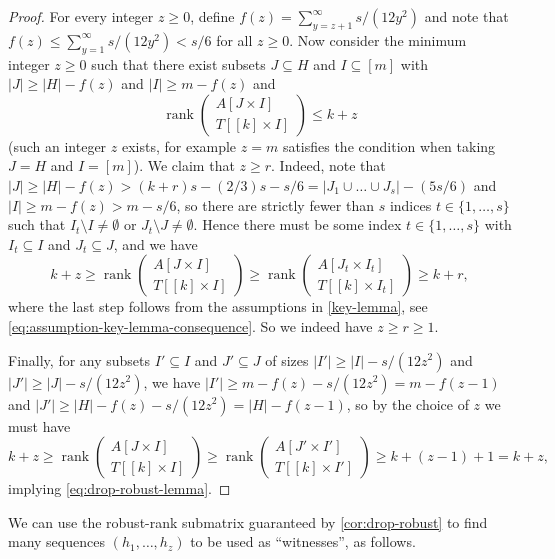 \documentclass[english]{article}
\theoremstyle{remark}
\numberwithin{equation}{section}
\numberwithin{figure}{section}
\newcommand{\su}{\subseteq}
\newcommand{\on}{\operatorname}
\begin{document}
\begin{proof}
For every integer $z\ge 0$, define $f(z)=\sum_{y=z+1}^{\infty} s/(12y^2)$ and note that $f(z)\le \sum_{y=1}^{\infty} s/(12y^2)< s/6$ for all $z\ge 0$. Now consider the minimum integer $z\ge 0$ such that there exist subsets $J\subseteq H$ and $I\subseteq[m]$ with $|J|\ge |H|-f(z)$ and $|I|\ge m-f(z)$ and
\[\on{rank}\begin{pmatrix}A[J\times I]\\ T[[k]\times I]\end{pmatrix}\le k+z\]
(such an integer $z$ exists, for example $z=m$ satisfies the condition when taking $J= H$ and $I=[m]$). We claim that $z\ge r$. Indeed, note that $|J|\ge |H|-f(z)> (k+r)s-(2/3)s-s/6=|J_1\cup\dots\cup J_s|-(5s/6)$ and $|I|\ge m-f(z)> m-s/6$, so there are strictly fewer than $s$ indices $t\in \{1,\dots,s\}$ such that $I_t\setminus I\ne \emptyset$ or $J_t\setminus J\ne \emptyset$. Hence there must be some index $t\in \{1,\dots,s\}$ with $I_t\su I$ and $J_t\su J$, and we have
\[k+z\ge \on{rank}\begin{pmatrix}A[J\times I]\\ T[[k]\times I]\end{pmatrix}\ge \on{rank}\begin{pmatrix}A[J_t\times I_t]\\ T[[k]\times I_t]\end{pmatrix}\ge k+r,\]
where the last step follows from the assumptions in \cref{key-lemma}, see \cref{eq:assumption-key-lemma-consequence}. So we indeed have $z\ge r\ge 1$.

Finally, for any subsets $I'\su I$ and $J'\su J$ of sizes $|I'|\ge |I|-s/(12z^2)$ and $|J'|\ge |J|-s/(12z^2)$, we have $|I'|\ge m-f(z)-s/(12z^2)=m-f(z-1)$ and $|J'|\ge |H|-f(z)-s/(12z^2)=|H|-f(z-1)$, so by the choice of $z$ we must have
\[k+z\ge \on{rank}\begin{pmatrix}A[J\times I]\\ T[[k]\times I]\end{pmatrix}\ge \on{rank}\begin{pmatrix}A[J'\times I']\\ T[[k]\times I']\end{pmatrix}\ge k+(z-1)+1=k+z,\]
implying \cref{eq:drop-robust-lemma}.
\end{proof}

We can use the robust-rank submatrix guaranteed by \cref{cor:drop-robust} to find many sequences $(h_1,\dots,h_z)$ to be used as ``witnesses'', as follows.
\end{document}
